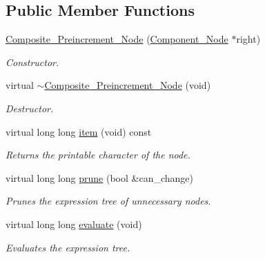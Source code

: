 \subsection*{Public Member Functions}
\begin{DoxyCompactItemize}
\item 
\hyperlink{classMadara_1_1Expression__Tree_1_1Composite__Preincrement__Node_a0ee8b7a19dfbd7c447409bbbf7b51989}{Composite\_\-Preincrement\_\-Node} (\hyperlink{classMadara_1_1Expression__Tree_1_1Component__Node}{Component\_\-Node} $\ast$right)
\begin{DoxyCompactList}\small\item\em Constructor. \item\end{DoxyCompactList}\item 
virtual \hyperlink{classMadara_1_1Expression__Tree_1_1Composite__Preincrement__Node_a3d24a0c130083c87069f51e38eef84ab}{$\sim$Composite\_\-Preincrement\_\-Node} (void)
\begin{DoxyCompactList}\small\item\em Destructor. \item\end{DoxyCompactList}\item 
virtual long long \hyperlink{classMadara_1_1Expression__Tree_1_1Composite__Preincrement__Node_ad86c898eba60ac46b1aa7aafa0e635ad}{item} (void) const 
\begin{DoxyCompactList}\small\item\em Returns the printable character of the node. \item\end{DoxyCompactList}\item 
virtual long long \hyperlink{classMadara_1_1Expression__Tree_1_1Composite__Preincrement__Node_aa9aa178cdcb1e0291547f3842eabb4f3}{prune} (bool \&can\_\-change)
\begin{DoxyCompactList}\small\item\em Prunes the expression tree of unnecessary nodes. \item\end{DoxyCompactList}\item 
virtual long long \hyperlink{classMadara_1_1Expression__Tree_1_1Composite__Preincrement__Node_ab2385695523608cc0bed77072e6806ae}{evaluate} (void)
\begin{DoxyCompactList}\small\item\em Evaluates the expression tree. \item\end{DoxyCompactList}\item 

\end{DoxyCompactItemize}
